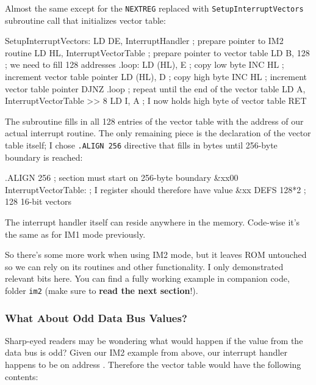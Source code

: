 Almost the same except for the {\tt NEXTREG} replaced with {\tt SetupInterruptVectors} subroutine call that initializes vector table:

\begin{tcblisting}{}
SetupInterruptVectors:
	LD DE, InterruptHandler        ; prepare pointer to IM2 routine
	LD HL, InterruptVectorTable   ; prepare pointer to vector table
	LD B, 128                      ; we need to fill 128 addresses
.loop:
	LD (HL), E                     ; copy low byte
	INC HL                         ; increment vector table pointer
	LD (HL), D	                   ; copy high byte
	INC HL                         ; increment vector table pointer
	DJNZ .loop                     ; repeat until the end of the vector table
	LD A, InterruptVectorTable >> 8
	LD I, A                        ; I now holds high byte of vector table
	RET
\end{tcblisting}

The subroutine fills in all 128 entries of the vector table with the address of our actual interrupt routine. The only remaining piece is the declaration of the vector table itself; I chose {\tt .ALIGN 256} directive that fills in bytes until 256-byte boundary is reached:

\begin{tcblisting}{}
	.ALIGN 256                     ; section must start on 256-byte boundary &xx00
InterruptVectorTable:              ; I register should therefore have value &xx
	DEFS 128*2                     ; 128 16-bit vectors	
\end{tcblisting}

The interrupt handler itself can reside anywhere in the memory. Code-wise it's the same as for IM1 mode previously.

So there's some more work when using IM2 mode, but it leaves ROM untouched so we can rely on its routines and other functionality. I only demonstrated relevant bits here. You can find a fully working example in companion code, folder {\tt im2} (make sure to \textbf{read the next section}!).


\subsubsection{What About Odd Data Bus Values?}

Sharp-eyed readers may be wondering what would happen if the value from the data bus is odd? Given our IM2 example from above, our interrupt handler happens to be on address . Therefore the vector table would have the following contents:

